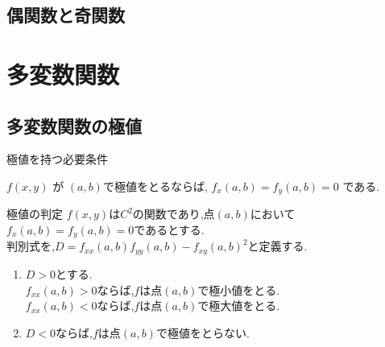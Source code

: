 \documentclass[a4paper]{jsarticle}
\begin{document}
\subsection{偶関数と奇関数}
\section{多変数関数}
\subsection{多変数関数の極値}
\begin{itembox}[l]{極値を持つ必要条件}
    \begin{center}
        $f\left(x,y\right)$ が $\left(a,b\right)$で極値をとるならば,
        $f_x\left(a,b\right)=f_y\left(a,b\right)=0$ である.
    \end{center}
\end{itembox}
\begin{itembox}[l]{極値の判定}
    $f\left(x,y\right)$は$C^2$の関数であり,点$\left(a,b\right)$において
    $f_x\left(a,b\right)=f_y\left(a, b\right)=0$であるとする.\\
    判別式を,$D=f_{xx}\left(a,b\right)f_{yy}\left(a,b\right)-{f_{xy}(a,b)}^2$と定義する.
    \begin{enumerate}[(1)]
        \item $D>0$とする.\\
              $f_{xx}\left(a,b\right)>0$ならば,$f$は点$\left(a,b\right)$で極小値をとる.\\
              $f_{xx}\left(a,b\right)<0$ならば,$f$は点$\left(a,b\right)$で極大値をとる.
        \item $D<0$ならば,$f$は点$\left(a,b\right)$で極値をとらない.
    \end{enumerate}
\end{itembox}
\end{document}

